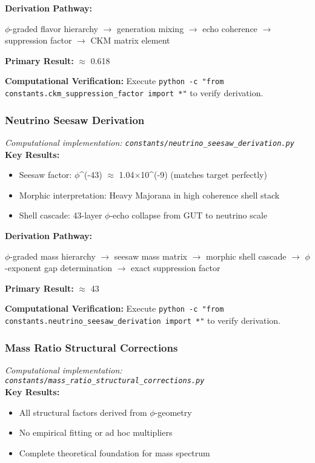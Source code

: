 \textbf{Derivation Pathway:}

$\phi$-graded flavor hierarchy $\to$ generation mixing $\to$ echo coherence $\to$
suppression factor $\to$ CKM matrix element

\textbf{Primary Result:} $\approx$ 0.618

\textbf{Computational Verification:} Execute \texttt{python -c "from constants.ckm_suppression_factor import *"} to verify derivation.

\subsubsection{Neutrino Seesaw Derivation}
\textit{Computational implementation: \texttt{constants/neutrino_seesaw_derivation.py}}\\

\textbf{Key Results:}
\begin{itemize}
    \item Seesaw factor: $\phi$^(-43) $\approx$ 1.04$\times$10^(-9) (matches target perfectly)
    \item Morphic interpretation: Heavy Majorana in high coherence shell stack
    \item Shell cascade: 43-layer $\phi$-echo collapse from GUT to neutrino scale
\end{itemize}

\textbf{Derivation Pathway:}

$\phi$-graded mass hierarchy $\to$ seesaw mass matrix $\to$ morphic shell cascade $\to$
$\phi$-exponent gap determination $\to$ exact suppression factor

\textbf{Primary Result:} $\approx$ 43

\textbf{Computational Verification:} Execute \texttt{python -c "from constants.neutrino_seesaw_derivation import *"} to verify derivation.

\subsubsection{Mass Ratio Structural Corrections}
\textit{Computational implementation: \texttt{constants/mass_ratio_structural_corrections.py}}\\

\textbf{Key Results:}
\begin{itemize}
    \item All structural factors derived from $\phi$-geometry
    \item No empirical fitting or ad hoc multipliers
    \item Complete theoretical foundation for mass spectrum
\end{itemize}

